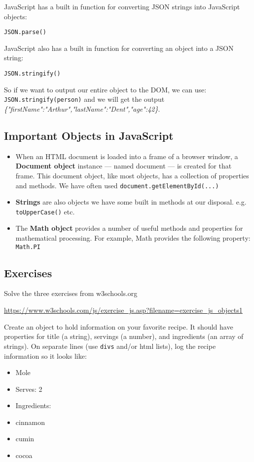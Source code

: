 \documentclass[english,11pt,a4paper]{report}
\begin{document}
JavaScript has a built in function for converting JSON strings into JavaScript objects:

\verb|JSON.parse()|

JavaScript also has a built in function for converting an object into a JSON string:

\verb|JSON.stringify()|

So if we want to output our entire object to the DOM, we can use: \verb|JSON.stringify(person)| and we will get the output \emph{\{"firstName":"Arthur","lastName":"Dent","age":42\}}.

\subsection{Important Objects in JavaScript}

\begin{itemize}
\item When an HTML document is loaded into a frame of a browser window, a {\bf Document object} instance — named document — is created for that frame. This document object, like most objects, has a collection of properties and methods. We have often used \verb|document.getElementById(...)|
\item {\bf Strings} are also objects we have some built in methods at our disposal. e.g. \verb|toUpperCase()| etc.
\item The {\bf Math object} provides a number of useful methods and properties for mathematical processing. For example, Math provides the following property: \verb|Math.PI|
\end{itemize}

\subsection{Exercises}
\begin{ex}
Solve the three exercises from w3schools.org

\url{https://www.w3schools.com/js/exercise_js.asp?filename=exercise_js_objects1}


\end{ex}

\begin{ex}
Create an object to hold information on your favorite recipe. It should have properties for title (a string), servings (a number), and ingredients (an array of strings).
On separate lines (use \verb|divs| and/or html lists), log the recipe information so it looks like:
\begin{itemize}
\item Mole
\item Serves: 2
\item Ingredients:
\item cinnamon
\item cumin
\item cocoa
\end{itemize}

\end{ex}
\end{document}
